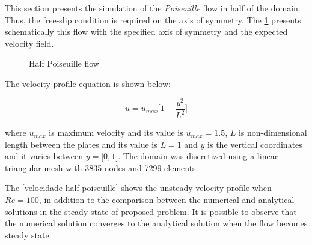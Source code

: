 This section presents the simulation of the \textit{Poiseuille} flow 
in half of the domain. Thus, the free-slip condition is required on 
the axis of symmetry. The \ref{half poiseuille} presents schematically 
this flow with the specified axis of symmetry and the expected velocity 
field.

\begin{figure}[H]
\caption{Half Poiseuille flow}
\begin{center}
\end{center}
\label{half poiseuille}
\end{figure}

\noindent
The velocity profile equation is shown below:

\begin{equation}
 u = u_{max} \big[ 1 - \frac{y^{2}}{L^{2}} \big]
\end{equation}


\medskip
where $u_{max}$ is maximum velocity and its value is 
$u_{max} = 1.5$, $L$ is non-dimensional length 
between the plates and its value is 
$L = 1$
and $y$ is the vertical coordinates and it varies 
between $y = \big[ 0,1 \big]$.
The domain was discretized using a linear triangular mesh
with 3835 nodes and 7299 elements.


\medskip
The \ref{velocidade half poiseuille} shows the unsteady velocity profile
when $Re=100$, in addition to the comparison between the 
numerical and analytical solutions in the steady state of
proposed problem. It is possible to observe that the numerical
solution converges to the analytical solution when the flow
becomes steady state.



